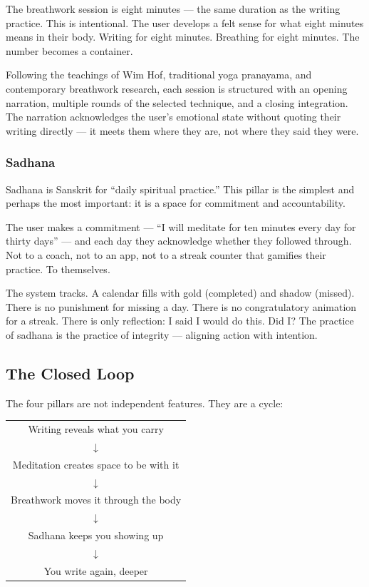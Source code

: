 \documentclass[12pt, a4paper]{article}
\begin{document}
The breathwork session is eight minutes --- the same duration as the writing practice. This is intentional. The user develops a felt sense for what eight minutes means in their body. Writing for eight minutes. Breathing for eight minutes. The number becomes a container.

Following the teachings of Wim Hof, traditional yoga pranayama, and contemporary breathwork research, each session is structured with an opening narration, multiple rounds of the selected technique, and a closing integration. The narration acknowledges the user's emotional state without quoting their writing directly --- it meets them where they are, not where they said they were.

\subsubsection{Sadhana}

Sadhana is Sanskrit for ``daily spiritual practice.'' This pillar is the simplest and perhaps the most important: it is a space for commitment and accountability.

The user makes a commitment --- ``I will meditate for ten minutes every day for thirty days'' --- and each day they acknowledge whether they followed through. Not to a coach, not to an app, not to a streak counter that gamifies their practice. To themselves.

The system tracks. A calendar fills with gold (completed) and shadow (missed). There is no punishment for missing a day. There is no congratulatory animation for a streak. There is only reflection: I said I would do this. Did I? The practice of sadhana is the practice of integrity --- aligning action with intention.

\subsection{The Closed Loop}

The four pillars are not independent features. They are a cycle:

\begin{center}
\begin{tabular}{c}
Writing reveals what you carry \\
$\downarrow$ \\
Meditation creates space to be with it \\
$\downarrow$ \\
Breathwork moves it through the body \\
$\downarrow$ \\
Sadhana keeps you showing up \\
$\downarrow$ \\
You write again, deeper \\
\end{tabular}
\end{center}
\end{document}
